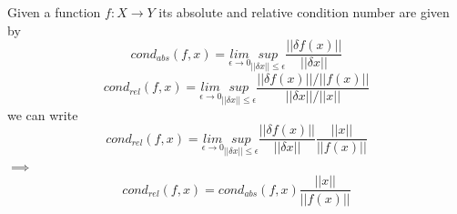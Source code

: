 Given a function $f:X\to Y$ its absolute and relative condition number are given by
\begin{equation}
    cond_{abs}(f,x) = \underset{\epsilon \to 0}{lim}\underset{||\delta x||\le \epsilon}{sup} \frac{||\delta f(x)||}{||\delta x||}
\end{equation}
\begin{equation}
    cond_{rel}(f,x) = \underset{\epsilon \to 0}{lim}\underset{||\delta x||\le \epsilon}{sup} \frac{||\delta f(x)||/||f(x)||}{||\delta x||/||x||}
\end{equation}
we can write
\begin{equation}
    cond_{rel}(f,x) = \underset{\epsilon \to 0}{lim}\underset{||\delta x||\le \epsilon}{sup} \frac{||\delta f(x)||}{||\delta x||}\frac{||x||}{||f(x)||}
\end{equation}
$\implies$
\begin{equation} \label{cond_abs_rel_relation}
    cond_{rel}(f,x) = cond_{abs}(f,x)\frac{||x||}{||f(x)||}
\end{equation}

